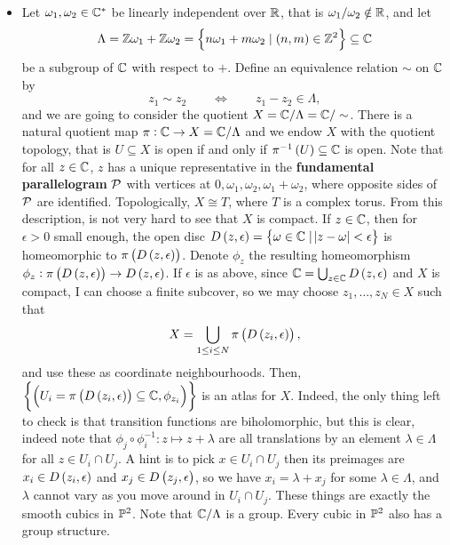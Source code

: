 \begin{example}
\begin{itemize}
\item Let $ \omega_1, \omega_2 \in \C^* $ be linearly independent over $ \R $, that is $ \omega_1 / \omega_2 \notin \R $, and let
$$ \Lambda = \Z\omega_1 + \Z\omega_2 = \cbr{n\omega_1 + m\omega_2 \mid \br{n, m} \in \Z^2} \subseteq \C $$
be a subgroup of $ \C $ with respect to $ + $. Define an equivalence relation $ \sim $ on $ \C $ by
$$ z_1 \sim z_2 \qquad \iff \qquad z_1 - z_2 \in \Lambda, $$
and we are going to consider the quotient $ X = \C / \Lambda = \C / \sim $. There is a natural quotient map $ \pi : \C \to X = \C / \Lambda $ and we endow $ X $ with the quotient topology, that is $ U \subseteq X $ is open if and only if $ \pi^{-1}\br{U} \subseteq \C $ is open. Note that for all $ z \in \C $, $ z $ has a unique representative in the \textbf{fundamental parallelogram} $ \PP $ with vertices at $ 0, \omega_1, \omega_2, \omega_1 + \omega_2 $, where opposite sides of $ \PP $ are identified. Topologically, $ X \cong T $, where $ T $ is a complex torus. From this description, is not very hard to see that $ X $ is compact. If $ z \in \C $, then for $ \epsilon > 0 $ small enough, the open disc $ D\br{z, \epsilon} = \cbr{\omega \in \C \mid \abs{z - \omega} < \epsilon} $ is homeomorphic to $ \pi\br{D\br{z, \epsilon}} $. Denote $ \phi_z $ the resulting homeomorphism $ \phi_z : \pi\br{D\br{z, \epsilon}} \to D\br{z, \epsilon} $. If $ \epsilon $ is as above, since $ \C = \bigcup_{z \in \C} D\br{z, \epsilon} $ and $ X $ is compact, I can choose a finite subcover, so we may choose $ z_1, \dots, z_N \in X $ such that
$$ X = \bigcup_{1 \le i \le N} \pi\br{D\br{z_i, \epsilon}}, $$
and use these as coordinate neighbourhoods. Then, $ \cbr{\br{U_i = \pi\br{D\br{z_i, \epsilon}} \subseteq \C, \phi_{z_i}}} $ is an atlas for $ X $. Indeed, the only thing left to check is that transition functions are biholomorphic, but this is clear, indeed note that $ \phi_j \circ \phi_i^{-1} : z \mapsto z + \lambda $ are all translations by an element $ \lambda \in \Lambda $ for all $ z \in U_i \cap U_j $. A hint is to pick $ x \in U_i \cap U_j $ then its preimages are $ x_i \in D\br{z_i, \epsilon} $ and $ x_j \in D\br{z_j, \epsilon} $, so we have $ x_i = \lambda + x_j $ for some $ \lambda \in \Lambda $, and $ \lambda $ cannot vary as you move around in $ U_i \cap U_j $. These things are exactly the smooth cubics in $ \P^2 $. Note that $ \C / \Lambda $ is a group. Every cubic in $ \P^2 $ also has a group structure.
\end{itemize}
\end{example}

